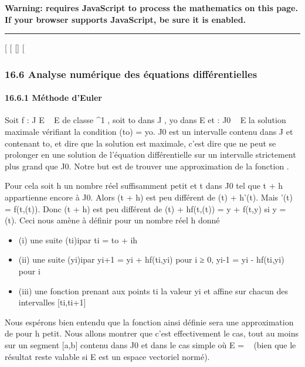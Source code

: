 \textbf{Warning: 
requires JavaScript to process the mathematics on this page.\\ If your
browser supports JavaScript, be sure it is enabled.}

\begin{center}\rule{3in}{0.4pt}\end{center}

{[}
{[}
{[}{]}
{[}

\subsubsection{16.6 Analyse numérique des équations différentielles}

\paragraph{16.6.1 Méthode d'Euler}

Soit f : J \times E \rightarrow~ E de classe ^1 , soit to dans J ,
yo dans E et \phi : J0 \rightarrow~ E la solution maximale
vérifiant la condition \phi(to) = yo. J0 est
un intervalle contenu dans J et contenant to, et dire que la
solution est maximale, c'est dire que \phi ne peut se prolonger en une
solution de l'équation différentielle sur un intervalle strictement plus
grand que J0. Notre but est de trouver une approximation de la
fonction \phi .

Pour cela soit h un nombre réel suffisamment petit et t dans
J0 tel que t + h appartienne encore à J0. Alors \phi(t
+ h) est peu différent de \phi(t) + h\phi'(t). Mais \phi'(t) = f(t,\phi(t)). Donc
\phi(t + h) est peu différent de \phi(t) + hf(t,\phi(t)) = y + f(t,y) si y =
\phi(t). Ceci nous amène à définir pour un nombre réel h donné

\begin{itemize}
\itemsep1pt\parskip0pt
\item
  (i) une suite (ti)i par ti =
  to + ih
\item
  (ii) une suite (yi)i par yi+1 =
  yi + hf(ti,yi) pour i ≥ 0,
  yi-1 = yi - hf(ti,yi) pour i 
\item
  (iii) une fonction \phih prenant aux points ti la
  valeur yi et affine sur chacun des intervalles
  {[}ti,ti+1{]}
\end{itemize}

Nous espérons bien entendu que la fonction \phih ainsi définie
sera une approximation de \phi pour h petit. Nous allons montrer que c'est
effectivement le cas, tout au moins sur un segment {[}a,b{]} contenu
dans J0 et dans le cas simple où E = ~ (bien que le résultat
reste valable si E est un espace vectoriel normé).

